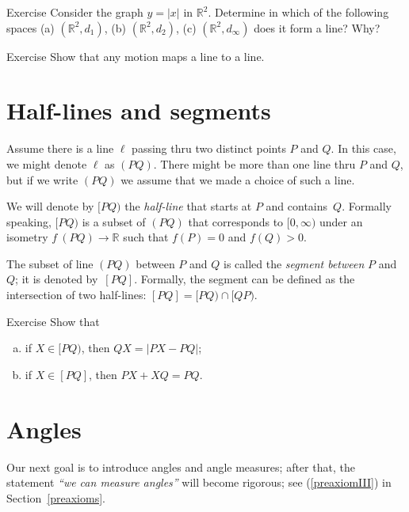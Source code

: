 \begin{thm}{Exercise}\label{ex:y=|x|}
Consider the graph $y=|x|$ in $\mathbb{R}^2$.
Determine in which of the following spaces 
(a) $(\mathbb{R}^2,d_1)$, 
(b) $(\mathbb{R}^2,d_2)$, 
(c) $(\mathbb{R}^2,d_\infty)$ 
does it form a line? 
Why?
\end{thm}

\begin{thm}{Exercise}\label{ex:line-motion}
Show that any motion maps a line to a line. 
\end{thm}

\section{Half-lines and segments}

Assume there is a line $\ell$ passing thru
two distinct points $P$ and $Q$.
In this case, we might denote $\ell$ as $(PQ)$.
There might be more than one line thru $P$ and $Q$,
but if we write \index{60@$(PQ)$, $[PQ)$, $[PQ]$}$(PQ)$ we assume that we made a choice of such a line. 

We will denote by $[P Q)$ the \emph{half-line}
that starts at $P$ and contains~$Q$. 
Formally speaking, $[P Q)$ is a subset of $(P Q)$ that corresponds to $[0,\infty)$ under an isometry $f\:(P Q)\to \mathbb{R}$ such that $f(P)=0$ and $f(Q)>0$.

The subset of line $(P Q)$ between $P$ and $Q$ is called the \emph{segment between} $P$ and $Q$; it is denoted by~$[P Q]$.
Formally, the segment can be defined as the intersection of two half-lines: $[P Q]=[P Q)\cap[Q P)$.

\begin{thm}{Exercise}\label{ex:trig==}
Show that 
\begin{enumerate}[(a)]
\item if $X\in [PQ)$, then 
$QX=|PX-PQ|$;
\item if $X\in [PQ]$, then 
$PX+XQ=PQ$.
\end{enumerate}

\end{thm}


\section{Angles}

Our next goal is to introduce angles and angle measures; 
after that, the statement \textit{``we can measure angles''} will become rigorous;
see (\ref{preaxiomIII}) in Section~\ref{preaxioms}.

